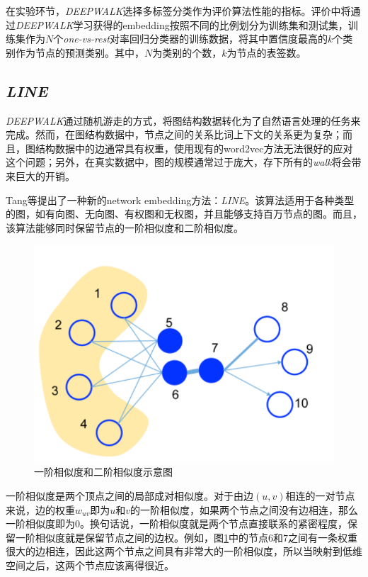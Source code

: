 在实验环节，\emph{DEEPWALK}选择多标签分类作为评价算法性能的指标。评价中将通过\emph{DEEPWALK}学习获得的embedding按照不同的比例划分为训练集和测试集，训练集作为$N$个\emph{one-vs-rest}对率回归分类器的训练数据，将其中置信度最高的$k$个类别作为节点的预测类别。其中，$N$为类别的个数，$k$为节点的表签数。

\subsection{\emph{LINE}}
\emph{DEEPWALK}通过随机游走的方式，将图结构数据转化为了自然语言处理的任务来完成。然而，在图结构数据中，节点之间的关系比词上下文的关系更为复杂；而且，图结构数据中的边通常具有权重，使用现有的word2vec方法无法很好的应对这个问题；另外，在真实数据中，图的规模通常过于庞大，存下所有的\emph{walk}将会带来巨大的开销。

Tang等\cite{tang2015line}提出了一种新的network embedding方法：\emph{LINE}。该算法适用于各种类型的图，如有向图、无向图、有权图和无权图，并且能够支持百万节点的图。而且，该算法能够同时保留节点的一阶相似度和二阶相似度。

\begin{figure}[!htbp]
  \centering
  \includegraphics[scale=1]{Fig/line.pdf}
  \caption{一阶相似度和二阶相似度示意图\cite{tang2015line}}
  \label{fig:line}
\end{figure}

一阶相似度是两个顶点之间的局部成对相似度。对于由边$(u, v)$相连的一对节点来说，边的权重$w_{uv}$即为$u$和$v$的一阶相似度，如果两个节点之间没有边相连，那么一阶相似度即为0。换句话说，一阶相似度就是两个节点直接联系的紧密程度，保留一阶相似度就是保留节点之间的边权。例如，图\ref{fig:line}中的节点$6$和$7$之间有一条权重很大的边相连，因此这两个节点之间具有非常大的一阶相似度，所以当映射到低维空间之后，这两个节点应该离得很近。

